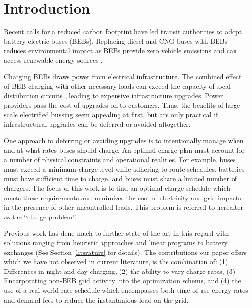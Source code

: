 \section{Introduction}
Recent calls for a reduced carbon footprint have led transit authorities to adopt battery electric buses (BEBs). Replacing diesel and CNG buses with BEBs reduces environmental impact \cite{zhou_optimization_2018} as BEBs provide zero vehicle emissions and can access renewable energy sources \cite{poornesh_comparative_2020, Mahmoud2016}.

\par Charging BEBs draws power from electrical infrastructure. The combined effect of BEB charging with other necessary loads can exceed the capacity of local distribution circuits \cite{stahleder_impact_2019, deb_impact_2017, boonraksa_impact_2019}, leading to expensive infrastructure upgrades. Power providers pass the cost of upgrades on to customers.  Thus, the benefits of large-scale electrified bussing seem appealing at first, but are only practical if infrastructural upgrades can be deferred or avoided altogether.

\par One approach to deferring or avoiding upgrades is to intentionally manage when and at what rates buses should charge. An optimal charge plan must account for a number of physical constraints and operational realities. For example, buses must exceed a minimum charge level while adhering to route schedules, batteries must have sufficient time to charge, and buses must share a limited number of chargers. The focus of this work is to find an optimal charge schedule which meets these requirements and minimizes the cost of electricity and grid impacts in the presence of other uncontrolled loads. This problem is referred to hereafter as the ``charge problem''.

\par Previous work has done much to further state of the art in this regard with solutions ranging from heuristic approaches and linear programs to battery exchanges (See Section \ref{literature} for details). The contributions our paper offers which we have not observed in current literature, is the combination of: (1) Differences in night and day charging, (2) the ability to vary charge rates, (3) Encorporating non-BEB grid activity into the optimization scheme, and (4) the use of a real-world rate schedule which encompasses both time-of-use energy rates and demand fees to reduce the instantanious load on the grid.

